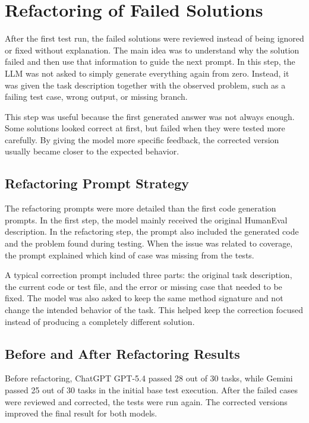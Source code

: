 \documentclass[journal]{IEEEtran}
\begin{document}
\section{Refactoring of Failed Solutions}

After the first test run, the failed solutions were reviewed instead of being ignored or fixed without explanation. The main idea was to understand why the solution failed and then use that information to guide the next prompt. In this step, the LLM was not asked to simply generate everything again from zero. Instead, it was given the task description together with the observed problem, such as a failing test case, wrong output, or missing branch.

This step was useful because the first generated answer was not always enough. Some solutions looked correct at first, but failed when they were tested more carefully. By giving the model more specific feedback, the corrected version usually became closer to the expected behavior.

\subsection{Refactoring Prompt Strategy}

The refactoring prompts were more detailed than the first code generation prompts. In the first step, the model mainly received the original HumanEval description. In the refactoring step, the prompt also included the generated code and the problem found during testing. When the issue was related to coverage, the prompt explained which kind of case was missing from the tests.

A typical correction prompt included three parts: the original task description, the current code or test file, and the error or missing case that needed to be fixed. The model was also asked to keep the same method signature and not change the intended behavior of the task. This helped keep the correction focused instead of producing a completely different solution.

\subsection{Before and After Refactoring Results}

Before refactoring, ChatGPT GPT-5.4 passed 28 out of 30 tasks, while Gemini passed 25 out of 30 tasks in the initial base test execution. After the failed cases were reviewed and corrected, the tests were run again. The corrected versions improved the final result for both models.
\end{document}
